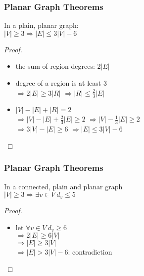 \documentclass[dvipsnames]{beamer}
\begin{document}
\begin{frame}
  \frametitle{Planar Graph Theorems}

  \begin{theorem}
    In a plain, planar graph:\\
    $|V| \geq 3 \Rightarrow |E| \leq 3 |V| - 6$
  \end{theorem}

  \pause
  \begin{proof}
    \begin{itemize}
      \item the sum of region degrees: $2 |E|$

      \pause
      \item degree of a region is at least $3$\\
        \pause
        $\Rightarrow 2 |E| \geq 3 |R|$
        \pause
        $\Rightarrow |R| \leq \frac{2}{3} |E|$

      \pause
      \item $|V| - |E| + |R| = 2$\\
        \pause
        $\Rightarrow |V| - |E| + \frac{2}{3} |E| \geq 2$
        \pause
        $\Rightarrow |V| - \frac{1}{3} |E| \geq 2$\\
        \pause
        $\Rightarrow 3 |V| - |E| \geq 6$
        \pause
        $\Rightarrow |E| \leq 3 |V| - 6$\\
    \end{itemize}
  \end{proof}
\end{frame}

\begin{frame}
  \frametitle{Planar Graph Theorems}

  \begin{theorem}
    In a connected, plain and planar graph\\
    $|V| \geq 3 \Rightarrow \exists v \in V~d_v \leq 5$
  \end{theorem}

  \pause
  \begin{proof}
    \begin{itemize}
      \item let $\forall v \in V~d_v \geq 6$\\
        \pause
        $\Rightarrow 2 |E| \geq 6 |V|$\\
        \pause
        $\Rightarrow |E| \geq 3 |V|$\\
        \pause
        $\Rightarrow |E| > 3 |V| - 6$: \alert{contradiction}
    \end{itemize}
  \end{proof}
\end{frame}
\end{document}

